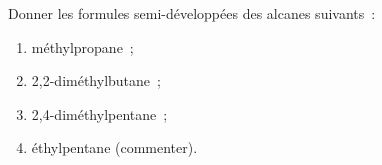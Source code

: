 Donner les formules semi-développées des alcanes suivants~:
\begin{enumerate}
    \item méthylpropane~;
    \item 2,2-diméthylbutane~;
    \item 2,4-diméthylpentane~;
    \item éthylpentane (commenter).
\end{enumerate}

